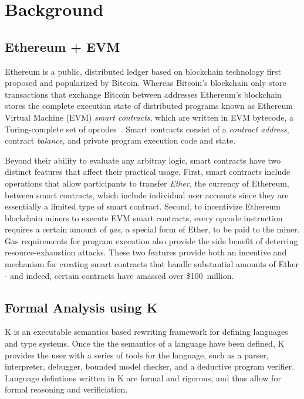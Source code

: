 \section{Background}
\subsection{Ethereum + EVM}
Ethereum is a public, distributed ledger based on blockchain technology first
proposed and popularized by Bitcoin. Whereas Bitcoin's blockchain only store
transactions that exchange Bitcoin between addresses Ethereum's blockchain
stores the complete execution state of distributed programs known as Ethereum
Virtual Machine (EVM) \textit{smart contracts}, which are written in EVM
bytecode, a Turing-complete set of \TK opcodes~\cite{yellowpaper}. Smart contracts
consist of a \textit{contract address}, contract \textit{balance}, and 
private program execution code and state. 

Beyond their ability to evaluate any arbitray logic, smart contracts have two distinct
features that affect their practical usage. First, smart contracts include operations
that allow participants to transfer \textit{Ether}, the currency of Ethereum, between
smart contracts, which include individual user accounts since they are essentially
a limited type of smart contract. Second, to incentivize Ethereum blockchain
miners to execute EVM smart contracts, every opcode instruction requires a
certain amount of \textit{gas}, a special form of Ether, to be paid to the
miner. Gas requirements for program execution also provide the side benefit of
deterring resource-exhaustion attacks. These two features provide both an incentive
and mechanism for creating smart contracts that handle substantial amounts of 
Ether - and indeed, certain contracts have amassed over \$100~million. 

\subsection{Formal Analysis using K}
K is an executable semantics based rewriting framework for defining languages and type systems. Once the the semantics of a language have been defined, K provides the user with a series of tools for the language, such as a parser, interpreter, debugger, bounded model checker, and a deductive program verifier. Language defintions written in K are formal and rigorous, and thus allow for formal reasoning and verificiation.  

